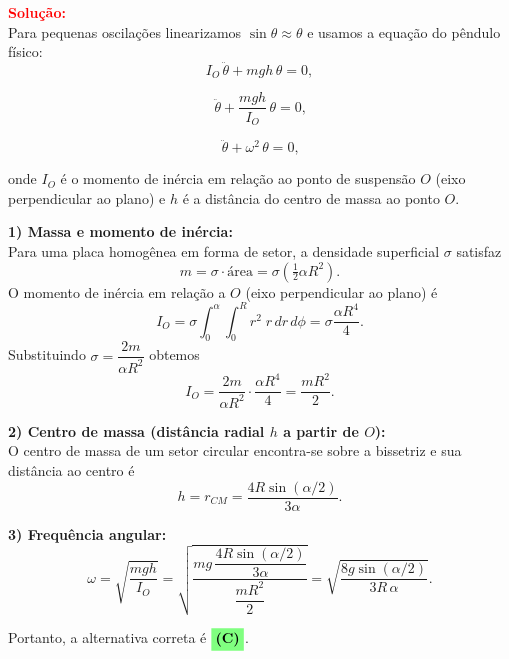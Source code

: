 \documentclass[a4paper,12pt]{article}
\begin{document}
\begin{flushleft}
\vspace{0.5cm}

\textcolor{red}{\textbf{Solução:}}\\

Para \colorbox{yellow!30}{pequenas oscila\c{c}\~oes linearizamos $\sin\theta\approx\theta$ e usamos a equa\c{c}\~ao do p\^endulo f\'isico:}
\[
I_O\,\ddot\theta + m g h\,\theta = 0,
\]

\[
\,\ddot\theta + \frac{m g h}{I_O}\,\theta = 0,
\]

\[
\,\ddot\theta + \omega^{2}\,\theta = 0,
\]


onde $I_O$ \'e o momento de in\'ercia em rela\c{c}\~ao ao ponto de suspens\~ao $O$ (eixo perpendicular ao plano) e $h$ \'e a dist\^ancia 
do centro de massa ao ponto $O$.

\textbf{1) Massa e momento de in\'ercia:}\\
Para uma placa homog\^enea em forma de setor, a densidade superficial $\sigma$ satisfaz
\[
m=\sigma\cdot\text{área}=\sigma\left(\tfrac{1}{2}\alpha R^2\right).
\]
O momento de in\'ercia em rela\c{c}\~ao a $O$ (eixo perpendicular ao plano) é
\[
I_O=\sigma\int_{0}^{\alpha}\int_{0}^{R} r^2\;r\,dr\,d\phi
=\sigma\frac{\alpha R^4}{4}.
\]
Substituindo $\sigma = \dfrac{2m}{\alpha R^2}$ obtemos
\[
I_O=\frac{2m}{\alpha R^2}\cdot\frac{\alpha R^4}{4}=\frac{mR^2}{2}.
\]

\textbf{2) Centro de massa (distância radial $h$ a partir de $O$):}\\
O centro de massa de um setor circular encontra-se sobre a bissetriz e sua distância ao centro é
\[
\boxed{
h=r_{CM}=\frac{4R\sin(\alpha/2)}{3\alpha}.
}
\]

\textbf{3) Frequência angular:}\\
\[
\omega=\sqrt{\frac{m g h}{I_O}}
=\sqrt{\frac{m g \,\dfrac{4R\sin(\alpha/2)}{3\alpha}}{\dfrac{mR^2}{2}}}
=\sqrt{\frac{8g\sin(\alpha/2)}{3R\,\alpha}}.
\]

Portanto, a alternativa correta é \(\colorbox{green!50}{\textbf{(C)}}\).

\end{flushleft}
\end{document}
